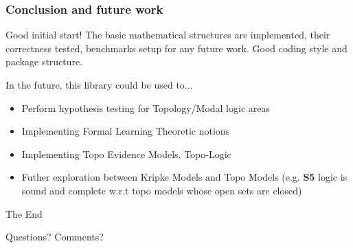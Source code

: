 \documentclass[
	11pt, %
	aspectratio=1610, %
]{beamer}
\begin{document}

\begin{frame}
	\frametitle{Conclusion and future work}

	Good initial start! The basic mathematical structures are implemented, their
	correctness tested, benchmarks setup for any future work. Good coding style and package structure.

	In the future, this library could be used to...

	\begin{itemize}
		\item Perform hypothesis testing for Topology/Modal logic areas
		\item Implementing Formal Learning Theoretic notions
		\item Implementing Topo Evidence Models, Topo-Logic
		\item Futher exploration between Kripke Models and Topo Models (e.g. \textbf{S5} 
		logic is sound and complete w.r.t topo models whose open sets are closed)
	\end{itemize}
\end{frame}


\begin{frame}[plain] %
	\begin{center}
		{\Huge The End}

		\bigskip\bigskip %

		{\LARGE Questions? Comments?}
	\end{center}
\end{frame}

\end{document}
